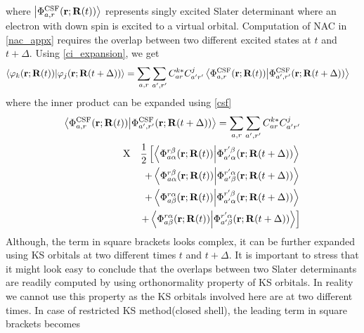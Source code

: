 where $\ket{\Phi_{a,r}^{\text{CSF}}(\mathbf{r};\mathbf{R}(t))}$ represents singly excited Slater determinant where an electron with down spin is excited to a virtual orbital. Computation of NAC in \eqref{nac_appx} requires the overlap between two different excited states at $t$ and $t+\Delta$. Using \eqref{ci_expansion}, we get
\begin{align}
    \ip{\varphi_k(\mathbf{r};\mathbf{R}(t))}{\varphi_j(\mathbf{r};\mathbf{R}(t+\Delta))} &= \sum_{a,r}\sum_{a',r'}C^{k*}_{ar}C^j_{a'r'} \ip{\Phi_{a,r}^{\text{CSF}}(\mathbf{r};\mathbf{R}(t))}{\Phi_{a',r'}^{\text{CSF}}(\mathbf{r};\mathbf{R}(t+\Delta))}
\end{align}
where the inner product can be expanded using \eqref{csf}
\begin{align}
    \ip{\Phi_{a,r}^{\text{CSF}}(\mathbf{r};\mathbf{R}(t))}{\Phi_{a',r'}^{\text{CSF}}(\mathbf{r};\mathbf{R}(t+\Delta))} = \sum_{a,r}\sum_{a',r'}C^{k*}_{ar}C^j_{a'r'} \nonumber\\
    \text{X} \quad \frac{1}{2}\left[ \ip{\Phi_{a\alpha}^{r\beta}(\mathbf{r};\mathbf{R}(t))}{\Phi_{a'\alpha}^{r'\beta}(\mathbf{r};\mathbf{R}(t+\Delta))} \nonumber \right.\\\left.
    + \ip{\Phi_{a\alpha}^{r\beta}(\mathbf{r};\mathbf{R}(t))}{\Phi_{a'\beta}^{r'\alpha}(\mathbf{r};\mathbf{R}(t+\Delta))} \nonumber \right.\\\left.
    + \ip{\Phi_{a\beta}^{r\alpha}(\mathbf{r};\mathbf{R}(t))}{\Phi_{a'\alpha}^{r'\beta}(\mathbf{r};\mathbf{R}(t+\Delta))} \nonumber \right.\\\left.
    + \ip{\Phi_{a\beta}^{r\alpha}(\mathbf{r};\mathbf{R}(t))}{\Phi_{a'\beta}^{r'\alpha}(\mathbf{r};\mathbf{R}(t+\Delta))}
    \right]
\end{align}
Although, the term in square brackets looks complex, it can be further expanded using KS orbitals at two different times $t$ and $t+\Delta$. It is important to stress that it might look easy to conclude that the overlaps between two Slater determinants are readily computed by using orthonormality property of KS orbitals. In reality we cannot use this property as the KS orbitals involved here are at two different times.
In case of restricted KS method(closed shell), the leading term in square brackets becomes\cite{werner_et_al}
